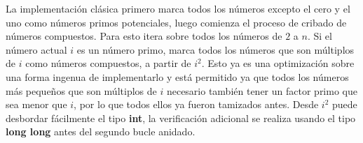 La implementación clásica primero marca todos los números excepto el cero y el uno como números primos potenciales, luego comienza el proceso de cribado de números compuestos. Para esto itera sobre todos los números de $2$ a $n$. Si el número actual $i$ es un número primo, marca todos los números que son múltiplos de $i$ como números compuestos, a partir de $i^2$. Esto ya es una optimización sobre una forma ingenua de implementarlo y está permitido ya que todos los números más pequeños que son múltiplos de $i$ necesario también tener un factor primo que sea menor que $i$, por lo que todos ellos ya fueron tamizados antes. Desde $i^2$ puede desbordar fácilmente el tipo \textbf{int}, la verificación adicional se realiza usando el tipo \textbf{long long} antes del segundo bucle anidado.